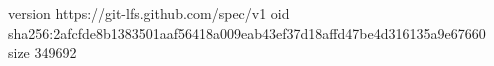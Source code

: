 version https://git-lfs.github.com/spec/v1
oid sha256:2afcfde8b1383501aaf56418a009eab43ef37d18affd47be4d316135a9e67660
size 349692
